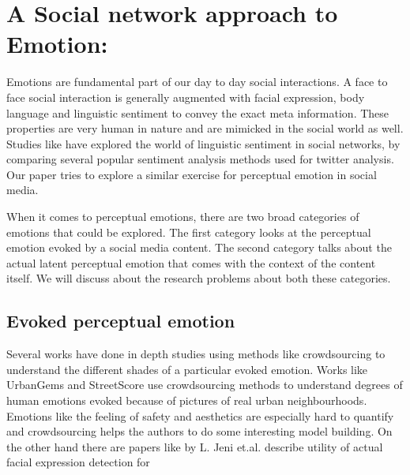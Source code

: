 \section{ A Social network approach to Emotion: }
Emotions are fundamental part of our day to day social interactions. A face to face social interaction is generally augmented with facial expression, body language and linguistic sentiment to convey the exact meta information. These properties are very human in nature and are mimicked in the social world as well. Studies like \cite{Joo2014b} have explored the world of linguistic sentiment in social networks, by comparing several popular sentiment analysis methods used for twitter analysis. Our paper tries to explore a similar exercise for perceptual emotion in social media. 
\par
When it comes to perceptual emotions, there are two broad categories of emotions that could be explored. The first category looks at the perceptual emotion evoked by a social media content. The second category talks about the actual latent perceptual emotion that comes with the context of the content itself. We will discuss about the research problems about both these categories.

\subsection{ Evoked perceptual emotion }
Several works have done in depth studies using methods like crowdsourcing to understand the different shades of a particular evoked emotion. Works like UrbanGems \cite{urbanGems} and StreetScore \cite{nikhil} use crowdsourcing methods to understand degrees of human emotions evoked because of pictures of real urban neighbourhoods. Emotions like the feeling of safety and aesthetics are especially hard to quantify and crowdsourcing helps the authors to do some interesting model building. On the other hand there are papers like \cite{jeni20123d} by L. Jeni et.al. describe utility of actual facial expression detection for 
